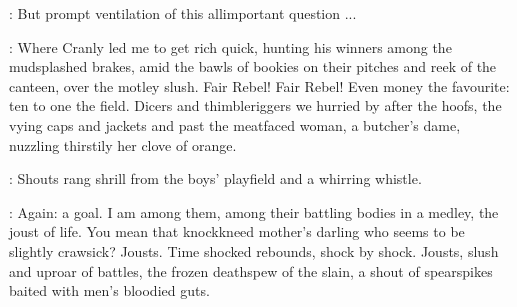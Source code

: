 \deasy:
But prompt ventilation of this allimportant question ...

\StephenInt:
Where Cranly led me to get rich quick,
hunting his winners among the mudsplashed brakes,
amid the bawls of bookies on their pitches and reek of the canteen,
over the motley slush.
Fair Rebel!
Fair Rebel!
Even money the favourite:
ten to one the field.
Dicers and thimbleriggers we hurried by after the hoofs,
the vying caps and jackets
and past the meatfaced woman,
a butcher's dame,
nuzzling thirstily her clove of orange.

:
Shouts rang shrill from the boys' playfield and a whirring whistle.

\StephenInt:
Again: a goal.
I am among them, among their battling bodies in a medley,
the joust of life.
You mean that knockkneed mother's darling who seems to be slightly crawsick?
Jousts.
Time shocked rebounds, shock by shock.
Jousts, slush and uproar of battles, the frozen deathspew of the slain,
a shout of spearspikes baited with men's bloodied guts.

